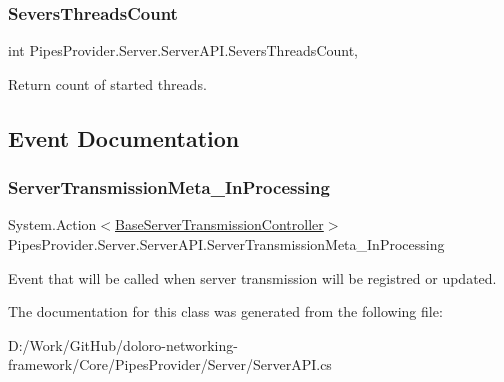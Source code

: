 \subsubsection{\texorpdfstring{Severs\+Threads\+Count}{SeversThreadsCount}}
{\footnotesize\ttfamily int Pipes\+Provider.\+Server.\+Server\+A\+P\+I.\+Severs\+Threads\+Count\hspace{0.3cm}{\ttfamily [static]}, {\ttfamily [get]}}



Return count of started threads. 



\subsection{Event Documentation}
\mbox{\label{class_pipes_provider_1_1_server_1_1_server_a_p_i_adf4c77f25cd481b8190240e4aca06e56}} 
\subsubsection{\texorpdfstring{Server\+Transmission\+Meta\+\_\+\+In\+Processing}{ServerTransmissionMeta\_InProcessing}}
{\footnotesize\ttfamily System.\+Action$<$\mbox{\hyperlink{class_pipes_provider_1_1_server_1_1_transmission_controllers_1_1_base_server_transmission_controller}{Base\+Server\+Transmission\+Controller}}$>$ Pipes\+Provider.\+Server.\+Server\+A\+P\+I.\+Server\+Transmission\+Meta\+\_\+\+In\+Processing\hspace{0.3cm}{\ttfamily [static]}}



Event that will be called when server transmission will be registred or updated. 



The documentation for this class was generated from the following file\+:\begin{DoxyCompactItemize}
\item 
D\+:/\+Work/\+Git\+Hub/doloro-\/networking-\/framework/\+Core/\+Pipes\+Provider/\+Server/Server\+A\+P\+I.\+cs\end{DoxyCompactItemize}
